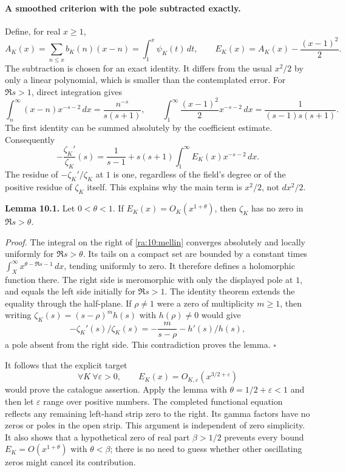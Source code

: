 \documentclass[11pt]{article}
\begin{document}
\paragraph{A smoothed criterion with the pole subtracted exactly.}
Define, for real $x\ge1$,
\[
 A_K(x)=\sum_{n\le x}b_K(n)(x-n)=\int_1^x\psi_K(t)\,dt,
 \qquad E_K(x)=A_K(x)-\frac{(x-1)^2}{2}.
\]
The subtraction is chosen for an exact identity. It differs from the usual
$x^2/2$ by only a linear polynomial, which is smaller than the contemplated
error. For $\Re s>1$, direct integration gives
\[
 \int_n^\infty(x-n)x^{-s-2}\,dx=\frac{n^{-s}}{s(s+1)},\qquad
 \int_1^\infty\frac{(x-1)^2}{2}x^{-s-2}\,dx
       =\frac1{(s-1)s(s+1)}.
\]
The first identity can be summed absolutely by the coefficient estimate.
Consequently
\begin{equation}\label{ra:10:mellin}
 -\frac{\zeta_K'}{\zeta_K}(s)
       =\frac1{s-1}+s(s+1)\int_1^\infty E_K(x)x^{-s-2}\,dx.
\end{equation}
The residue of $-\zeta_K'/\zeta_K$ at $1$ is one, regardless of the
field's degree or of the positive residue of $\zeta_K$ itself. This
explains why the main term is $x^2/2$, not $dx^2/2$.

\textbf{Lemma 10.1.} Let $0<\theta<1$. If
$E_K(x)=O_K(x^{1+\theta})$, then $\zeta_K$ has no zero in
$\Re s>\theta$.

\textit{Proof.}
The integral on the right of \eqref{ra:10:mellin} converges absolutely
and locally uniformly for $\Re s>\theta$. Its tails on a compact set
are bounded by a constant times
$\int_X^\infty x^{\theta-\Re s-1}\,dx$, tending uniformly to zero.
It therefore defines a holomorphic function there. The right side is
meromorphic with only the displayed pole at $1$, and equals the left side
initially for $\Re s>1$. The identity theorem extends the equality through
the half-plane. If $\rho\ne1$ were a zero of multiplicity $m\ge1$, then
writing $\zeta_K(s)=(s-\rho)^mh(s)$ with $h(\rho)\ne0$ would give
\[
 -\zeta_K'(s)/\zeta_K(s)=-\frac m{s-\rho}-h'(s)/h(s),
\]
a pole absent from the right side. This contradiction proves the lemma.
\hfill$\square$

It follows that the explicit target
\begin{equation}\label{ra:10:missing}
 \forall K\ \forall\varepsilon>0,\qquad
 E_K(x)=O_{K,\varepsilon}(x^{3/2+\varepsilon})
\end{equation}
would prove the catalogue assertion. Apply the lemma with
$\theta=1/2+\varepsilon<1$ and then let $\varepsilon$ range over positive
numbers. The completed functional equation reflects any remaining
left-hand strip zero to the right. Its gamma factors have no zeros or
poles in the open strip. This argument is independent of zero simplicity.
It also shows that a hypothetical zero of real part $\beta>1/2$ prevents
every bound $E_K=O(x^{1+\theta})$ with $\theta<\beta$; there is no need
to guess whether other oscillating zeros might cancel its contribution.
\end{document}
